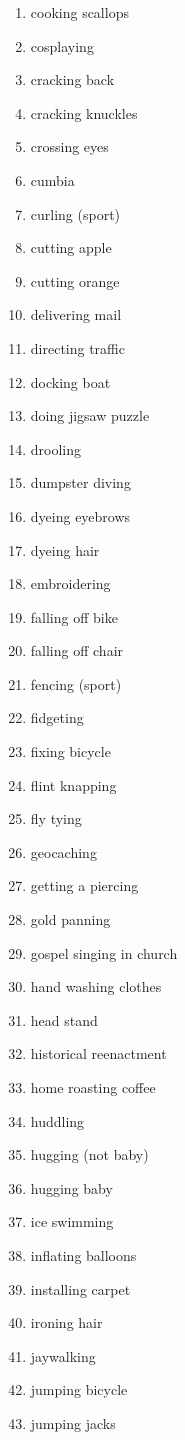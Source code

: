 \documentclass[10pt,twocolumn,letterpaper]{article}
\begin{document}
\begin{enumerate}
\item cooking scallops
\item cosplaying
\item cracking back
\item cracking knuckles
\item crossing eyes
\item cumbia
\item curling (sport)
\item cutting apple
\item cutting orange
\item delivering mail
\item directing traffic
\item docking boat
\item doing jigsaw puzzle
\item drooling
\item dumpster diving
\item dyeing eyebrows
\item dyeing hair
\item embroidering
\item falling off bike
\item falling off chair
\item fencing (sport)
\item fidgeting
\item fixing bicycle
\item flint knapping
\item fly tying
\item geocaching
\item getting a piercing
\item gold panning
\item gospel singing in church
\item hand washing clothes
\item head stand
\item historical reenactment
\item home roasting coffee
\item huddling
\item hugging (not baby)
\item hugging baby
\item ice swimming
\item inflating balloons
\item installing carpet
\item ironing hair
\item jaywalking
\item jumping bicycle
\item jumping jacks

\end{enumerate}
\end{document}
